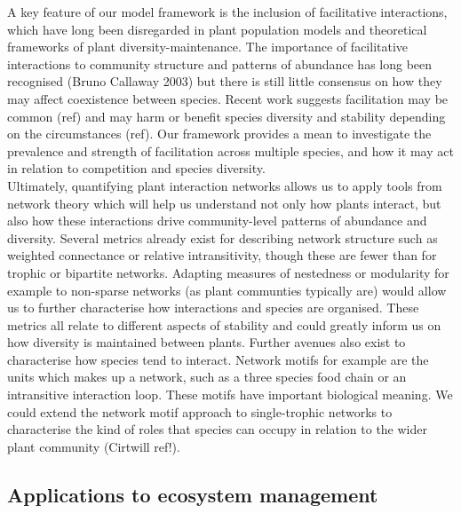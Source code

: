 \documentclass[a4,12pt]{article}
\begin{document}
        A key feature of our model framework is the inclusion of facilitative interactions, which have long been disregarded in plant population models and theoretical frameworks of plant diversity-maintenance. The importance of facilitative interactions to community structure and patterns of abundance has long been recognised (Bruno Callaway 2003) but there is still little consensus on how they may affect coexistence between species. Recent work suggests facilitation may be common (ref) and may harm or benefit species diversity and stability depending on the circumstances (ref). Our framework provides a mean to investigate the prevalence and strength of facilitation across multiple species, and how it may act in relation to competition and species diversity. \\
     
        Ultimately, quantifying plant interaction networks allows us to apply tools from network theory which will help us understand not only how plants interact, but also how these interactions drive community-level patterns of abundance and diversity. Several metrics already exist for describing network structure such as weighted connectance or relative intransitivity, though these are fewer than for trophic or bipartite networks. Adapting measures of nestedness or modularity for example to non-sparse networks (as plant communties typically are) would allow us to further characterise how interactions and species are organised. These metrics all relate to different aspects of stability and could greatly inform us on how diversity is maintained between plants. 
        Further avenues also exist to characterise how species tend to interact. Network motifs for example are the units which makes up a network, such as a three species food chain or an intransitive interaction loop. These motifs have important biological meaning. We could extend the network motif approach to single-trophic networks to characterise the kind of roles that species can occupy in relation to the wider plant community (Cirtwill ref!).\\



    \subsection{Applications to ecosystem management}
\end{document}
